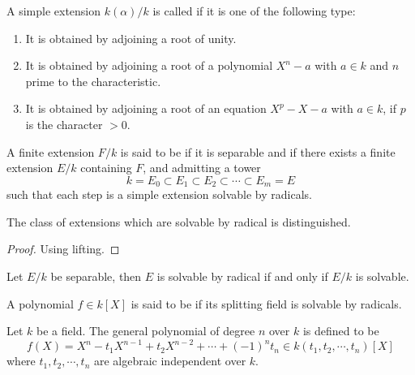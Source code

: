   \begin{defn}
    A simple extension $k(\alpha)/k$ is called  if it is one of the following type:
    \begin{enumerate}
      \item It is obtained by adjoining a root of unity.
      \item It is obtained by adjoining a root of a polynomial $X^n-a$ with $a\in k$ and $n$ prime to the characteristic.
      \item It is obtained by adjoining a root of an equation $X^p-X-a$ with $a\in k$, if $p$ is the character $>0$.
    \end{enumerate}

    A finite extension $F/k$ is said to be  if it is separable and if there exists a finite extension $E/k$ containing $F$, and admitting a tower
    \begin{equation*}
      k=E_0\subset E_1\subset E_2\subset\cdots\subset E_m=E
    \end{equation*}
    such that each step is a simple extension solvable by radicals.
  \end{defn}

  \begin{prop}
    The class of extensions which are solvable by radical is distinguished.
  \end{prop}
  \begin{proof}
    Using lifting.
  \end{proof}

  \begin{thm}
    Let $E/k$ be separable, then $E$ is solvable by radical if and only if $E/k$ is solvable.
  \end{thm}

  \begin{defn}
    A polynomial $f\in k[X]$ is said to be  if its splitting field is solvable by radicals.
  \end{defn}

  \begin{defn}
    Let $k$ be a field. The general polynomial of degree $n$ over $k$ is defined to be
    \begin{equation*}
      f(X)=X^n-t_1X^{n-1}+t_2X^{n-2}+\cdots+(-1)^nt_n\in k(t_1,t_2,\cdots,t_n)[X]
    \end{equation*}
    where $t_1,t_2,\cdots,t_n$ are algebraic independent over $k$.
  \end{defn}

